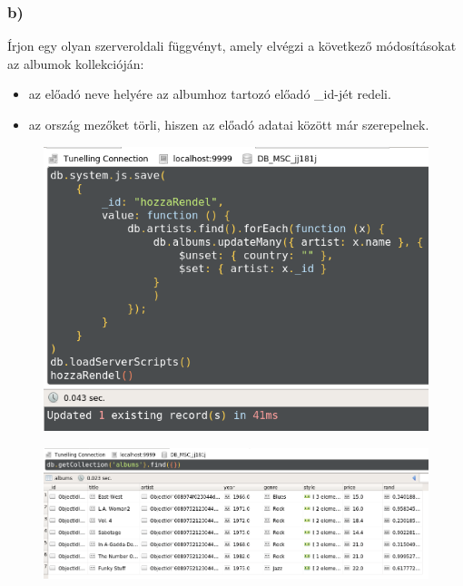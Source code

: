 \documentclass[a4paper, 12pt]{article}
\begin{document}
\subsubsection*{b)}
Írjon egy olyan szerveroldali függvényt, amely elvégzi a következő módosításokat az albumok kollekcióján:
\begin{itemize}[label=-]
\item az előadó neve helyére az albumhoz tartozó előadó \_id-jét redeli.
\item az ország mezőket törli, hiszen az előadó adatai között már szerepelnek.
\end{itemize}
\begin{figure}[!hb]
	\centering
	\includegraphics[scale = 0.65]{images/2_b1.png}
	\label{fig:2_b1}
\end{figure}
\begin{figure}[!hb]
	\centering
	\includegraphics[scale = 0.45]{images/2_b2.png}
	\label{fig:2_b2}
\end{figure}
\clearpage
\end{document}
